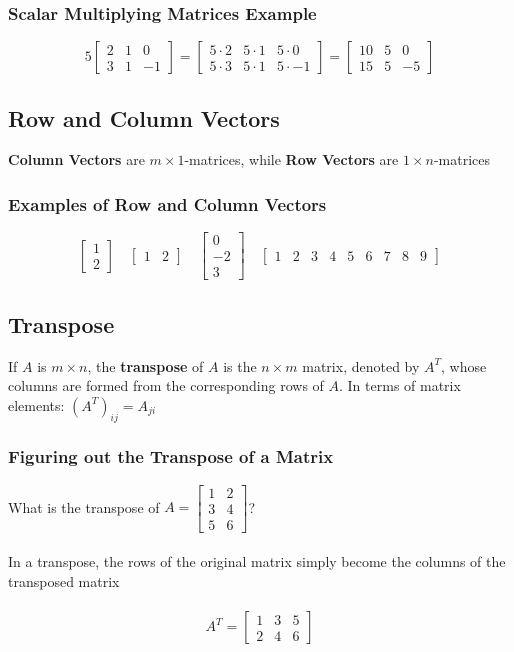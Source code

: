 \subsubsection{Scalar Multiplying Matrices Example}
\[
  5 \begin{bmatrix}
    2 & 1 & 0 \\
    3 & 1 & -1
  \end{bmatrix} = \begin{bmatrix}
    5 \cdot 2 & 5 \cdot 1 & 5 \cdot 0 \\
    5 \cdot 3 & 5 \cdot 1 & 5 \cdot -1
  \end{bmatrix} = \begin{bmatrix}
    10 & 5 & 0 \\
    15 & 5 & -5
  \end{bmatrix}
\]
\subsection{Row and Column Vectors}
\textbf{Column Vectors} are $m \times 1$-matrices, while \textbf{Row Vectors}
are $1 \times n$-matrices
\subsubsection{Examples of Row and Column Vectors}
\[
  \begin{bmatrix}
    1 \\
    2
  \end{bmatrix} \quad
  \begin{bmatrix}
    1 & 2
  \end{bmatrix} \quad
  \begin{bmatrix}
    0 \\
    -2 \\
    3
  \end{bmatrix} \quad
  \begin{bmatrix}
    1 & 2 & 3 & 4 & 5 & 6 & 7 & 8 & 9
  \end{bmatrix}
\]
\subsection{Transpose}
If $A$ is $m \times n$, the \textbf{transpose} of $A$ is the $n \times m$ matrix,
denoted by $A^T$, whose columns are formed from the corresponding rows of $A$. In 
terms of matrix elements: $(A^T)_{ij} = A_{ji}$ \\
\subsubsection{Figuring out the Transpose of a Matrix}
What is the transpose of $A = \begin{bmatrix}
  1 & 2 \\
  3 & 4 \\
  5 & 6
\end{bmatrix}$? \\\\
In a transpose, the rows of the original matrix simply become the columns of the 
transposed matrix \\\\
\[
  A^T = \begin{bmatrix}
    1 & 3 & 5 \\
    2 & 4 & 6
  \end{bmatrix}
\]
